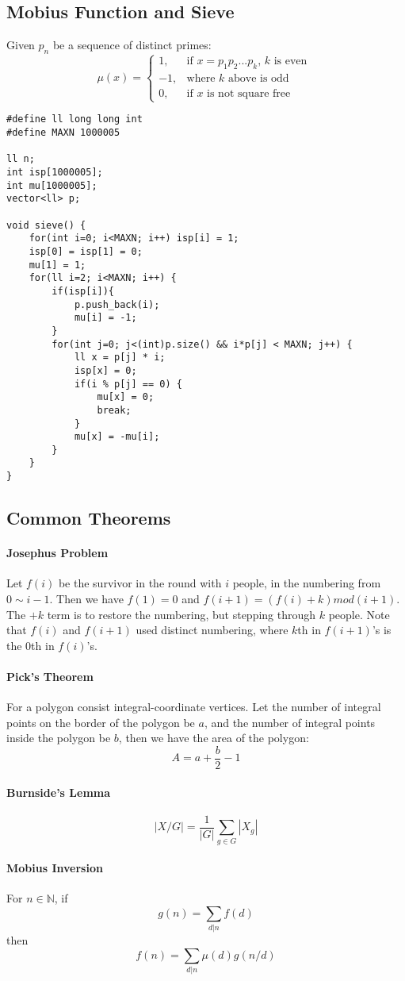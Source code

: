 \subsection{Mobius Function and Sieve}
Given ${p_n}$ be a sequence of distinct primes:
$$
\mu(x)=
\begin{cases}
	1, &\text{if $x=p_1p_2...p_k$, $k$ is even }\\
	-1, &\text{where $k$ above is odd}\\
	0, &\text{if $x$ is not square free}
\end{cases}
$$
\begin{lstlisting}
#define ll long long int
#define MAXN 1000005

ll n;
int isp[1000005];
int mu[1000005];
vector<ll> p;

void sieve() {
	for(int i=0; i<MAXN; i++) isp[i] = 1;
	isp[0] = isp[1] = 0;
	mu[1] = 1;
	for(ll i=2; i<MAXN; i++) {
		if(isp[i]){
			p.push_back(i);
			mu[i] = -1;
		}
		for(int j=0; j<(int)p.size() && i*p[j] < MAXN; j++) {
			ll x = p[j] * i;
			isp[x] = 0;
			if(i % p[j] == 0) {
				mu[x] = 0;
				break;
			}
			mu[x] = -mu[i];
		}
	}
}
\end{lstlisting}
\subsection{Common Theorems}
\paragraph{Josephus Problem}
Let $f(i)$ be the survivor in the round with $i$ people, in the numbering from $0\sim i-1$. Then we have $f(1) = 0$ and $f(i+1) = (f(i)+k) mod (i+1)$. The $+k$ term is to restore the numbering, but stepping through $k$ people. Note that $f(i)$ and $f(i+1)$ used distinct numbering, where $k$th in $f(i+1)$'s is the $0$th in $f(i)$'s.
\paragraph{Pick's Theorem}
For a polygon consist integral-coordinate vertices. Let the number of integral points on the border of the polygon be $a$, and the number of integral points inside the polygon be $b$, then we have the area of the polygon:
$$
A = a+\frac{b}{2}-1
$$
\paragraph{Burnside's Lemma}
$$
|X/G| = \frac{1}{|G|}\sum_{g\in G}{|X_g|}
$$
\paragraph{Mobius Inversion}
For $n\in \mathbb{N}$, if
$$
g(n)=\sum_{d|n}{f(d)}
$$
then
$$
f(n)=\sum_{d|n}{\mu(d)g(n/d)}
$$
